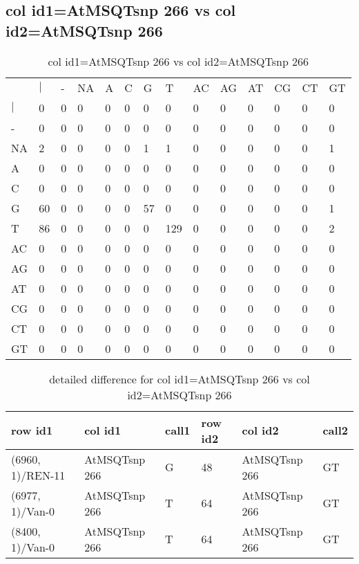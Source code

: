 \subsection{col id1=AtMSQTsnp 266 vs col id2=AtMSQTsnp 266}
\begin{center}
\begin{longtable}{|l|l|l|l|l|l|l|l|l|l|l|l|l|l|}
\caption{col id1=AtMSQTsnp 266 vs col id2=AtMSQTsnp 266} \label{table_dm804}\\
\hline
\\
\hline
&$|$&-&NA&A&C&G&T&AC&AG&AT&CG&CT&GT\\
$|$&0&0&0&0&0&0&0&0&0&0&0&0&0\\
-&0&0&0&0&0&0&0&0&0&0&0&0&0\\
NA&2&0&0&0&0&1&1&0&0&0&0&0&1\\
A&0&0&0&0&0&0&0&0&0&0&0&0&0\\
C&0&0&0&0&0&0&0&0&0&0&0&0&0\\
G&60&0&0&0&0&57&0&0&0&0&0&0&1\\
T&86&0&0&0&0&0&129&0&0&0&0&0&2\\
AC&0&0&0&0&0&0&0&0&0&0&0&0&0\\
AG&0&0&0&0&0&0&0&0&0&0&0&0&0\\
AT&0&0&0&0&0&0&0&0&0&0&0&0&0\\
CG&0&0&0&0&0&0&0&0&0&0&0&0&0\\
CT&0&0&0&0&0&0&0&0&0&0&0&0&0\\
GT&0&0&0&0&0&0&0&0&0&0&0&0&0\\
\hline
\end{longtable}
\end{center}

\begin{center}
\begin{longtable}{|l|l|l|l|l|l|}
\caption{detailed difference for col id1=AtMSQTsnp 266 vs col id2=AtMSQTsnp 266} \label{table_dm805}\\
\hline
row id1&col id1&call1&row id2&col id2&call2\\
\hline
(6960, 1)/REN-11&AtMSQTsnp 266&G&48&AtMSQTsnp 266&GT\\
(6977, 1)/Van-0&AtMSQTsnp 266&T&64&AtMSQTsnp 266&GT\\
(8400, 1)/Van-0&AtMSQTsnp 266&T&64&AtMSQTsnp 266&GT\\
\hline
\end{longtable}
\end{center}

